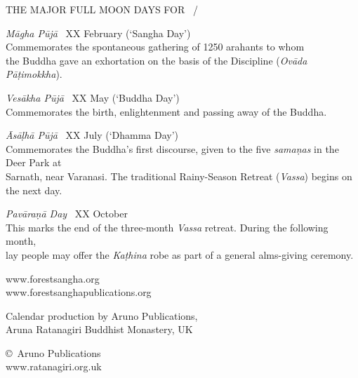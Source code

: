 {{{\large THE MAJOR FULL MOON DAYS FOR \theCalendarYear\ / \theCalendarAltYear}

\emph{Māgha Pūjā} \spacedcdot\ XX February (`Sangha Day')\\
Commemorates the spontaneous gathering of 1250 arahants to whom\\
the Buddha gave an exhortation on the basis of the Discipline (\emph{Ovāda Pāṭimokkha}).

\emph{Vesākha Pūjā} \spacedcdot\ XX May (`Buddha Day')\\
Commemorates the birth, enlightenment and passing away of the Buddha.

\emph{Āsāḷhā Pūjā} \spacedcdot\ XX July (`Dhamma Day')\\
Commemorates the Buddha's first discourse, given to the five \emph{samaṇas} in the Deer Park at\\
Sarnath, near Varanasi. The traditional Rainy-Season Retreat (\emph{Vassa}) begins on the next day.

\emph{Pavāraṇā Day} \spacedcdot\ XX October\\
This marks the end of the three-month \emph{Vassa} retreat. During the following month,\\
lay people may offer the \emph{Kaṭhina} robe as part of a general alms-giving ceremony.

\vspace{0.3\baselineskip}

www.forestsangha.org\\
www.forestsanghapublications.org

Calendar production by Aruno Publications,\\
Aruna Ratanagiri Buddhist Monastery, UK

\copyright\ Aruno Publications \the\year\\
www.ratanagiri.org.uk

\vspace{0.9\baselineskip}

}

}%


